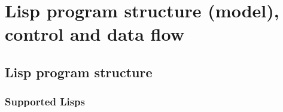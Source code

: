 \documentclass[../Maxima_Workbook.tex]{subfiles}
\begin{document}
\part{Lisp program structure (model), control and data flow}

\chapter{Lisp program structure}

\section{Supported Lisps}
\end{document}
